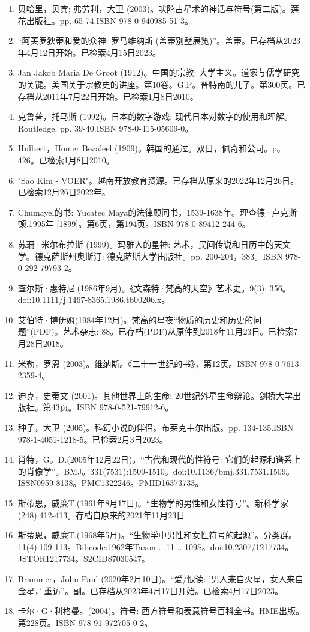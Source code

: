 \begin{enumerate}
\item 贝哈里，贝宾; 弗劳利，大卫 (2003)。吠陀占星术的神话与符号(第二版)。莲花出版社。pp. 65-74.ISBN 978-0-940985-51-3。
\item “阿芙罗狄蒂和爱的众神: 罗马维纳斯 (盖蒂别墅展览)”。盖蒂。已存档从2023年4月12日开始。已检索4月15日2023。
\item Jan Jakob Maria De Groot (1912)。中国的宗教: 大学主义。道家与儒学研究的关键。美国关于宗教史的讲座。第10卷。G.P。普特南的儿子。第300页。已存档从2011年7月22日开始。已检索1月8日2010。
\item 克鲁普，托马斯 (1992)。日本的数字游戏: 现代日本对数字的使用和理解。Routledge. pp. 39-40.ISBN 978-0-415-05609-0。
\item Hulbert，Homer Bezaleel (1909)。韩国的通过。双日，佩奇和公司。p。 426。已检索1月8日2010。
\item "Sao Kim - VOER"。越南开放教育资源。已存档从原来的2022年12月26日。已检索12月26日2022年。
\item Chumayel的书: Yucatec Maya的法律顾问书，1539-1638年。理查德·卢克斯顿.1995年 [1899]。第6页，第194页。ISBN 978-0-89412-244-6。
\item 苏珊·米尔布拉斯 (1999)。玛雅人的星神: 艺术，民间传说和日历中的天文学。德克萨斯州奥斯汀: 德克萨斯大学出版社。pp. 200-204，383。ISBN 978-0-292-79793-2。
\item 查尔斯·惠特尼.(1986年9月)。《文森特·梵高的天空》艺术史。9(3): 356。doi:10.1111/j.1467-8365.1986.tb00206.x。
\item 艾伯特·博伊姆(1984年12月)。梵高的星夜“物质的历史和历史的问题”(PDF)。艺术杂志: 88。已存档(PDF)从原件到2018年11月23日。已检索7月28日2018。
\item 米勒，罗恩 (2003)。维纳斯。《二十一世纪的书》，第12页。ISBN 978-0-7613-2359-4。
\item 迪克，史蒂文 (2001)。其他世界上的生命: 20世纪外星生命辩论。剑桥大学出版社。第43页。ISBN 978-0-521-79912-6。
\item 种子，大卫 (2005)。科幻小说的伴侣。布莱克韦尔出版。pp. 134-135.ISBN 978-1-4051-1218-5。已检索2月3日2023。
\item 肖特，G。D.(2005年12月22日)。“古代和现代的性符号: 它们的起源和谱系上的肖像学”。BMJ。331(7531):1509-1510。doi:10.1136/bmj.331.7531.1509。ISSN0959-8138。PMC1322246。PMID16373733。   
\item 斯蒂恩，威廉T.(1961年8月17日)。“生物学的男性和女性符号”。新科学家(248):412-413。存档自原来的2021年11月23日
\item 斯蒂恩，威廉T.(1968年5月)。“生物学中男性和女性符号的起源”。分类群。11(4):109-113。Bibcode:1962年Taxon .. 11 .. 109S。doi:10.2307/1217734。JSTOR1217734。S2CID87030547。  
\item Brammer，John Paul (2020年2月10日)。“爱/恨读: '男人来自火星，女人来自金星，' 重访”。副。已存档从2023年4月17日开始。已检索4月17日2023。
\item 卡尔·G·利格曼。(2004)。符号: 西方符号和表意符号百科全书。HME出版。第228页。ISBN 978-91-972705-0-2。
\end{enumerate}
